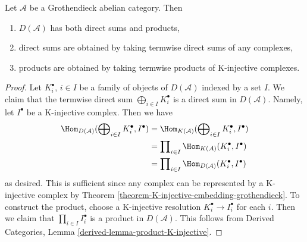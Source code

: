 \begin{lemma}
\label{lemma-derived-products}
Let $\mathcal{A}$ be a Grothendieck abelian category.
Then
\begin{enumerate}
\item $D(\mathcal{A})$ has both direct sums and products,
\item direct sums are obtained by taking termwise direct sums of
any complexes,
\item products are obtained by taking termwise products of
K-injective complexes.
\end{enumerate}
\end{lemma}

\begin{proof}
Let $K^\bullet_i$, $i \in I$ be a family of objects of $D(\mathcal{A})$
indexed by a set $I$. We claim that the termwise direct sum
$\bigoplus_{i \in I} K^\bullet_i$ is a direct sum in $D(\mathcal{A})$.
Namely, let $I^\bullet$ be a K-injective complex. Then we have
\begin{align*}
\Hom_{D(\mathcal{A})}(\bigoplus\nolimits_{i \in I} K^\bullet_i, I^\bullet)
& =
\Hom_{K(\mathcal{A})}(\bigoplus\nolimits_{i \in I} K^\bullet_i, I^\bullet) \\
& =
\prod\nolimits_{i \in I} \Hom_{K(\mathcal{A})}(K^\bullet_i, I^\bullet) \\
& =
\prod\nolimits_{i \in I} \Hom_{D(\mathcal{A})}(K^\bullet_i, I^\bullet)
\end{align*}
as desired. This is sufficient since any complex can be represented
by a K-injective complex by
Theorem \ref{theorem-K-injective-embedding-grothendieck}.
To construct the product, choose a K-injective resolution
$K_i^\bullet \to I_i^\bullet$ for each $i$. Then we claim that
$\prod_{i \in I} I_i^\bullet$ is a product in $D(\mathcal{A})$.
This follows from
Derived Categories, Lemma \ref{derived-lemma-product-K-injective}.
\end{proof}
